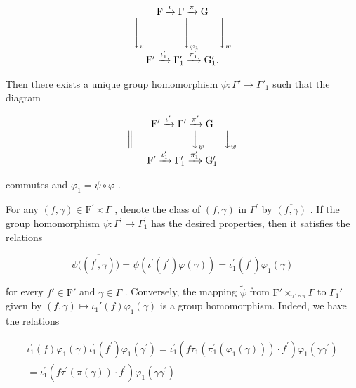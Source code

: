 \[
\begin{array}{c} \mathrm{F} \xrightarrow {\iota} \Gamma \xrightarrow {\pi} \mathrm{G} \\ \Biggl \downarrow_ {v} \qquad \qquad \Biggl \downarrow_ {\varphi_ {1}} \qquad \Biggl \downarrow_ {w} \\ \mathrm{F} ^ {\prime} \xrightarrow {\iota_ {1} ^ {\prime}} \Gamma_ {1} ^ {\prime} \xrightarrow {\pi_ {1} ^ {\prime}} \mathrm{G} _ {1} ^ {\prime}. \end{array}
\]

Then there exists a unique group homomorphism \(\psi : \Gamma' \to \Gamma'_1\) such that the diagram

\[
\begin{array}{c} \mathrm{F} ^ {\prime} \xrightarrow {\iota^ {\prime}} \Gamma^ {\prime} \xrightarrow {\pi^ {\prime}} \mathrm{G} \\ \Big \| \qquad \qquad \qquad \Big \downarrow_ {\psi} \qquad \Big \downarrow_ {w} \\ \mathrm{F} ^ {\prime} \xrightarrow {\iota_ {1} ^ {\prime}} \Gamma_ {1} ^ {\prime} \xrightarrow {\pi_ {1} ^ {\prime}} \mathrm{G} _ {1} ^ {\prime} \end{array}
\]

commutes and \(\varphi_{1} = \psi \circ \varphi\) .

For any \((f,\gamma)\in\mathrm{F}^{\prime}\times\Gamma\) , denote the class of \((f,\gamma)\) in \(\Gamma^{\prime}\) by \(\overline{(f,\gamma)}\) . If the group homomorphism \(\psi:\Gamma^{\prime}\to\Gamma_{1}^{\prime}\) has the desired properties, then it satisfies the relations

\[
\psi \big (\overline {{(f ^ {\prime} , \gamma)}} \big) = \psi (\iota^ {\prime} (f ^ {\prime}) \varphi (\gamma)) = \iota_ {1} ^ {\prime} (f ^ {\prime}) \varphi_ {1} (\gamma)
\]

for every \(f' \in \mathrm{F}'\) and \(\gamma \in \Gamma\) . Conversely, the mapping \(\tilde{\psi}\) from \(\mathrm{F}' \times_{\tau' \circ \pi} \Gamma\) to \(\Gamma_1'\) given by \((f, \gamma) \mapsto \iota_1'(f) \varphi_1(\gamma)\) is a group homomorphism. Indeed, we have the relations

\[
\begin{array}{r} \iota_ {1} ^ {\prime} (f) \varphi_ {1} (\gamma) \iota_ {1} ^ {\prime} (f ^ {\prime}) \varphi_ {1} (\gamma^ {\prime}) = \iota_ {1} ^ {\prime} (f \tau_ {1} (\pi_ {1} ^ {\prime} (\varphi_ {1} (\gamma))) \cdot f ^ {\prime}) \varphi_ {1} (\gamma \gamma^ {\prime}) \\ = \iota_ {1} ^ {\prime} (f \tau^ {\prime} (\pi (\gamma)) \cdot f ^ {\prime}) \varphi_ {1} (\gamma \gamma^ {\prime}) \end{array}
\]

